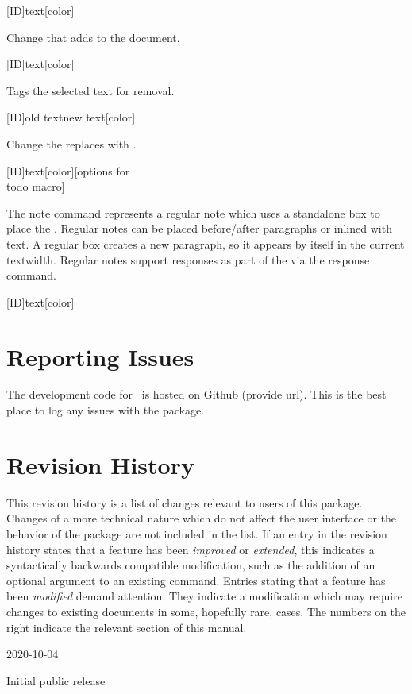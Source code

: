 \documentclass{ltxdockit}[2010/09/26]
\newcommand*\review{\sty{review}}
\begin{document}
\begin{ltxsyntax}

[ID]{text}[color]

Change that adds  to the document.

[ID]{text}[color]

Tags the selected text for removal.

[ID]{old text}{new text}[color]

Change the replaces  with .

[ID]{text}[color][options for \\todo macro]

The note command represents a regular note which uses a standalone box to place
the . Regular notes can be placed before/after paragraphs or inlined
with text. A regular box creates a new paragraph, so it appears by itself in
the current textwidth. Regular notes support responses as part of the
 via the response command.

[ID]{text}[color]

\end{ltxsyntax}


\section{Reporting Issues}

The development code for \review\ is hosted on Github (provide url). This is the best place to log any
issues with the package.


\section{Revision History}

This revision history is a list of changes relevant to users of this package.
Changes of a more technical nature which do not affect the user interface or
the behavior of the package are not included in the list. If an entry in the
revision history states that a feature has been \emph{improved} or
\emph{extended}, this indicates a syntactically backwards compatible
modification, such as the addition of an optional argument to an existing
command. Entries stating that a feature has been \emph{modified} demand
attention. They indicate a modification which may require changes to existing
documents in some, hopefully rare, cases. The numbers on the right indicate the
relevant section of this manual.

\begin{changelog}

\begin{release}{1.0}{2020-10-04}
\item Initial public release
\end{release}

\end{changelog}
\end{document}
